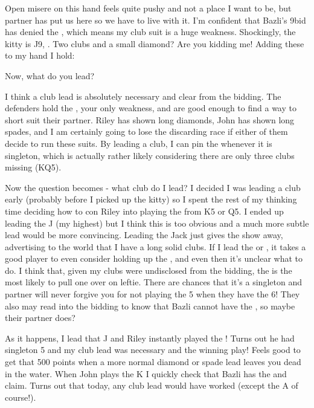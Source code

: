 \documentclass[a4paper]{JoshCards}
\begin{document}
Open misere on this hand feels quite pushy and not a place I want to be, but partner has put us here so we have to live with it. I'm confident that Bazli's 9\D bid has denied the , which means my club suit is a huge weakness. Shockingly, the kitty is \C J9, . Two clubs and a small diamond? Are you kidding me! Adding these to my hand I hold:
\begin{center}
    \par\noindent
\end{center}
Now, what do you lead?

I think a club lead is absolutely necessary and clear from the bidding. The defenders hold the , your only weakness, and are good enough to find a way to short suit their partner. Riley has shown long diamonds, John has shown long spades, and I am certainly going to lose the discarding race if either of them decide to run these suits. By leading a club, I can pin the  whenever it is singleton, which is actually rather likely considering there are only three clubs missing (\C KQ5).

Now the question becomes - what club do I lead? I decided I was leading a club early (probably before I picked up the kitty) so I spent the rest of my thinking time deciding how to con Riley into playing the  from \C K5 or \C Q5. I ended up leading the \C J (my highest) but I think this is too obvious and a much more subtle lead would be more convincing. Leading the Jack just gives the show away, advertising to the world that I have a long solid clubs. If I lead the  or , it takes a good player to even consider holding up the , and even then it's unclear what to do. I think that, given my clubs were undisclosed from the bidding, the  is the most likely to pull one over on leftie. There are chances that it's a singleton  and partner will never forgive you for not playing the 5 when they have the 6! They also may read into the bidding to know that Bazli cannot have the , so maybe their partner does?

As it happens, I lead that \C J and Riley instantly played the ! Turns out he had singleton 5 and my club lead was necessary and the winning play! Feels good to get that 500 points when a more normal diamond or spade lead leaves you dead in the water. When John plays the \C K I quickly check that Bazli has the  and claim. Turns out that today, any club lead would have worked (except the \C A of course!).
\end{document}
